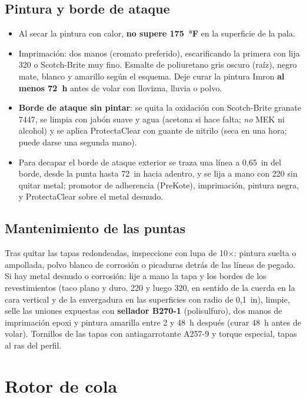 \subsection{Pintura y borde de ataque}

\begin{itemize}
\item Al secar la pintura con calor, \textbf{no supere 175~°F} en la superficie de la pala.
\item Imprimación: dos manos (cromato preferido), escarificando la primera con lija 320 o Scotch-Brite muy fino. Esmalte de poliuretano gris oscuro (raíz), negro mate, blanco y amarillo según el esquema. Deje curar la pintura Imron \textbf{al menos 72~h} antes de volar con llovizna, lluvia o polvo.
\item \textbf{Borde de ataque sin pintar}: se quita la oxidación con Scotch-Brite granate 7447, se limpia con jabón suave y agua (acetona si hace falta; \emph{no} MEK ni alcohol) y se aplica ProtectaClear con guante de nitrilo (seca en una hora; puede darse una segunda mano).
\item Para decapar el borde de ataque exterior se traza una línea a 0,65~in del borde, desde la punta hasta 72~in hacia adentro, y se lija a mano con 220 sin quitar metal; promotor de adherencia (PreKote), imprimación, pintura negra, y ProtectaClear sobre el metal desnudo.
\end{itemize}

\subsection{Mantenimiento de las puntas}

Tras quitar las tapas redondeadas, inspeccione con lupa de 10$\times$: pintura suelta o ampollada, polvo blanco de corrosión o picaduras detrás de las líneas de pegado. Si hay metal desnudo o corrosión: lije a mano la tapa y los bordes de los revestimientos (taco plano y duro, 220 y luego 320, en sentido de la cuerda en la cara vertical y de la envergadura en las superficies con radio de 0,1~in), limpie, selle las uniones expuestas con \textbf{sellador B270-1} (polisulfuro), dos manos de imprimación epoxi y pintura amarilla entre 2 y 48~h después (curar 48~h antes de volar). Tornillos de las tapas con antiagarrotante A257-9 y torque especial, tapas al ras del perfil.

\section{Rotor de cola}

